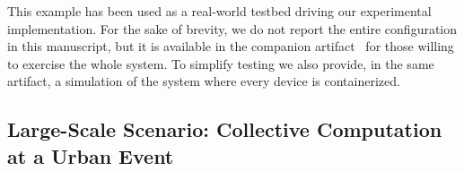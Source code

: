 \documentclass[conference]{IEEEtran}
\newcommand{\meta}[1]{{\color{blue}#1}}
\begin{document}
This example has been used as a real-world testbed driving our experimental implementation.
%
For the sake of brevity,
we do not report the entire configuration in this manuscript, but it is available in the companion artifact~\cite{https://doi.org/10.5281/zenodo.7933160}
for those willing to exercise the whole system.
%
To simplify testing we also provide,
in the same artifact,
a simulation of the system where every device is containerized.

\subsection{Large-Scale Scenario: Collective Computation at a Urban Event}
\end{document}
